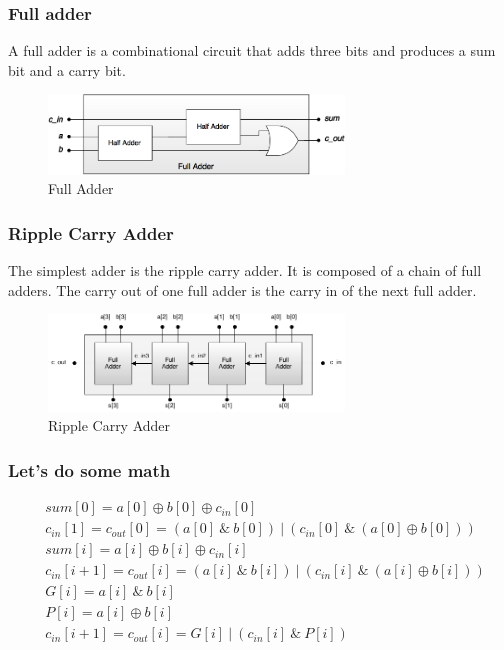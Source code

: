 \begin{frame}
    \frametitle{Full adder}
    A full adder is a combinational circuit that adds three bits and produces a sum bit and a carry bit.
    \begin{figure}
        \centering
        \includegraphics[width=0.7\textwidth]{media/full-adder-gates.png}
        \caption{Full Adder}
    \end{figure}
\end{frame}

\begin{frame}
    \frametitle{Ripple Carry Adder}
    The simplest adder is the ripple carry adder. It is composed of a chain of full adders. The carry out of one full adder is the carry in of the next full adder.
    \begin{figure}
        \centering
        \includegraphics[width=0.7\textwidth]{media/ripple-carry.png}
        \caption{Ripple Carry Adder}
    \end{figure}
\end{frame}

\begin{frame}
    \frametitle{Let's do some math}
    \begin{equation}
        \begin{aligned}
            &sum[0]=a[0] \oplus b[0] \oplus c_{in}[0]\\
            &c_{in}[1]=c_{out}[0]=(a[0]\ \& \ b[0]) \ | \ (c_{in}[0] \ \& \ (a[0] \oplus b[0]))\\
            &sum[i]=a[i] \oplus b[i] \oplus c_{in}[i]\\
            &c_{in}[i+1]=c_{out}[i]=(a[i] \ \& \ b[i]) \ | \ (c_{in}[i] \ \& \ (a[i] \oplus b[i]))\\
            &G[i]=a[i] \ \& \ b[i]\\
            &P[i]=a[i] \oplus b[i]\\
            &c_{in}[i+1]=c_{out}[i]=G[i] \ | \ (c_{in}[i] \ \& \ P[i])
        \end{aligned}
    \end{equation}
\end{frame}


